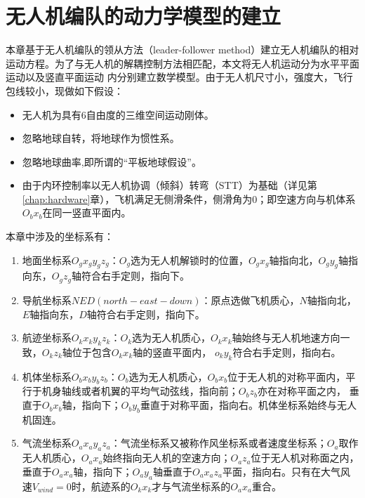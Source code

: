 \chapter{无人机编队的动力学模型的建立}
\label{chap:formation_dynamic_equ}
本章基于无人机编队的领从方法（leader-follower method）建立无人机编队的相对运动方程。为了与无人机的解耦控制方法相匹配，本文将无人机运动分为水平平面运动以及竖直平面运动
内分别建立数学模型。由于无人机尺寸小，强度大，飞行包线较小，现做如下假设：
\begin{itemize}
    \item 无人机为具有6自由度的三维空间运动刚体。
    \item 忽略地球自转，将地球作为惯性系。
    \item 忽略地球曲率,即所谓的“平板地球假设”。%
    \item 由于内环控制率以无人机协调（倾斜）转弯（STT）为基础（详见第\ref{chap:hardware}章），飞机满足无侧滑条件，侧滑角为0；即空速方向与机体系$O_bx_b$在同一竖直平面内。
\end{itemize}
本章中涉及的坐标系有：
\begin{enumerate}
    \item 地面坐标系$O_gx_gy_gz_g$：$O_g$选为无人机解锁时的位置，$O_gx_g$轴指向北，$O_gy_g$轴指向东，$O_gz_g$轴符合右手定则，指向下。
    \item 导航坐标系$NED(north-east-down)$：原点选做飞机质心，$N$轴指向北，$E$轴指向东，$D$轴符合右手定则，指向下。
    \item 航迹坐标系$O_kx_ky_kz_k$：$O_k$选为无人机质心，$O_kx_k$轴始终与无人机地速方向一致，$O_kz_k$轴位于包含$O_kx_k$轴的竖直平面内，
    $o_ky_k$符合右手定则，指向右。
    \item 机体坐标系$O_bx_by_bz_b$：$O_b$选为无人机质心，$O_bx_b$位于无人机的对称平面内，平行于机身轴线或者机翼的平均气动弦线，指向前；$O_bz_b$亦在对称平面之内，
    垂直于$O_bx_b$轴，指向下；$O_by_b$垂直于对称平面，指向右。机体坐标系始终与无人机固连。
    \item 气流坐标系$O_ax_ay_az_a$：气流坐标系又被称作风坐标系或者速度坐标系；$O_a$取作无人机质心，$O_ax_a$始终指向无人机的空速方向；$O_az_a$位于无人机对称面之内，
    垂直于$O_ax_a$轴，指向下；$O_ay_a$轴垂直于$O_ax_az_a$平面，指向右。只有在大气风速$V_{wind}=0$时，航迹系的$O_kx_k$才与气流坐标系的$O_ax_a$重合。
\end{enumerate}

